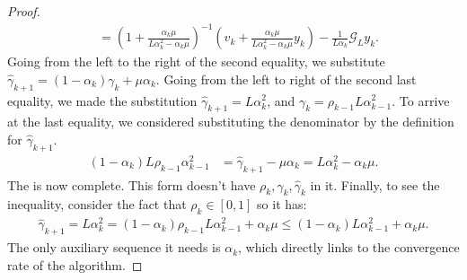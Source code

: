 \documentclass[12pt]{article}
\begin{document}
\begin{proof}
\begin{align*}
                &= 
                \left(
                    1 + \frac{\alpha_k \mu}{L \alpha_k^2 - \alpha_k \mu}
                \right)^{-1}
                \left(
                    v_k + 
                    \frac{\alpha_k \mu}{L \alpha_k^2 - \alpha_k \mu} y_k
                \right)
                - \frac{1}{L\alpha_{k}}\mathcal G_L y_k. 
            \end{align*}
            Going from the left to the right of the second equality, we substitute $\hat \gamma_{k + 1} = (1 - \alpha_k)\gamma_k + \mu\alpha_k$. 
            Going from the left to right of the second last equality, we made the substitution $\hat \gamma_{k + 1} = L \alpha_k^2$, and $\gamma_k = \rho_{k - 1}L \alpha_{k - 1}^2$. 
            To arrive at the last equality, we considered substituting the denominator by the definition for $\hat\gamma_{k + 1}$. 
            \begin{align*}
                (1 - \alpha_k)L\rho_{k - 1}\alpha_{k - 1}^2
                &= 
                \hat \gamma_{k + 1} - \mu \alpha_k
                = 
                L\alpha_{k}^2 - \alpha_k\mu. 
            \end{align*}
            The is now complete. 
            This form doesn't have $\rho_k, \gamma_k, \hat \gamma_k$ in it. 
            Finally, to see the inequality, consider the fact that $\rho_k \in [0, 1]$ so it has: 
            \begin{align*}
                \hat \gamma_{k + 1} = L\alpha_k^2 = (1 - \alpha_k)\rho_{k - 1}L \alpha_{k - 1}^2 + \alpha_k \mu 
                \le (1 - \alpha_k)L \alpha_{k - 1}^2 + \alpha_k \mu. 
            \end{align*}
            The only auxiliary sequence it needs is $\alpha_k$, which directly links to the convergence rate of the algorithm. 
        \end{proof}
        
\end{document}
